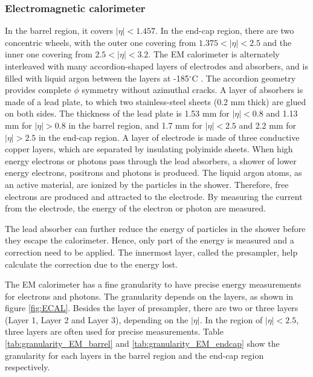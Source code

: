 \subsubsection{Electromagnetic calorimeter}
In the barrel region, it covers $|\eta| < 1.457$.
In the end-cap region, there are two concentric wheels, with the outer one covering from $1.375 <|\eta| < 2.5$ and the inner one covering from $2.5 <|\eta| < 3.2$.
The EM calorimeter is alternately interleaved with many accordion-shaped layers of electrodes and absorbers, and is filled with liquid argon between the layers at -185$^{\circ}$C .
The accordion geometry provides complete $\phi$ symmetry without azimuthal cracks.
A layer of absorbers is made of a lead plate, to which two stainless-steel sheets (0.2 mm thick) are glued on both sides.
The thickness of the lead plate is 1.53 mm for $|\eta| < 0.8$ and 1.13 mm for $|\eta| > 0.8$ in the barrel region, and 1.7 mm for $|\eta| < 2.5$ and 2.2 mm for $|\eta| > 2.5$ in the end-cap region.
A layer of electrode is made of three conductive copper layers, which are separated by insulating polyimide sheets.
When high energy electrons or photons pass through the lead absorbers, a shower of lower energy electrons, positrons and photons is produced.
The liquid argon atoms, as an active material, are ionized by the particles in the shower.
Therefore, free electrons are produced and attracted to the electrode.
By measuring the current from the electrode, the energy of the electron or photon are measured.

The lead absorber can further reduce the energy of particles in the shower before they escape the calorimeter.
Hence, only part of the energy is measured and a correction need to be applied.
The innermost layer, called the presampler, help calculate the correction due to the energy lost.

The EM calorimeter has a fine granularity to have precise energy measurements for electrons and photons.
The granularity depends on the layers, as shown in figure \ref{fig:ECAL}.
Besides the layer of presampler, there are two or three layers (Layer 1, Layer 2 and Layer 3), depending on the $|\eta|$.
In the region of $|\eta|<2.5$, three layers are often used for precise measurements.
Table \ref{tab:granularity_EM_barrel} and \ref{tab:granularity_EM_endcap} show the granularity for each layers in the barrel region and the end-cap region respectively.

